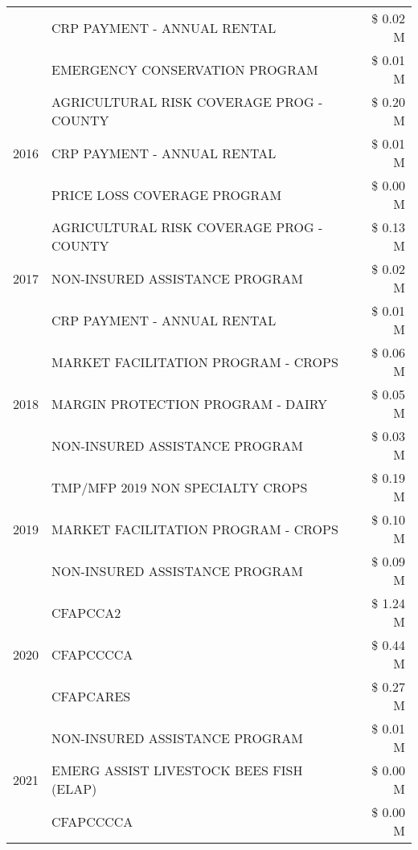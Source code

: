 \begin{tabular}{llr}
 & CRP PAYMENT - ANNUAL RENTAL & \$ 0.02 M \\
 & EMERGENCY CONSERVATION PROGRAM & \$ 0.01 M \\
\cline{1-3}
\multirow[t]{3}{*}{2016} & AGRICULTURAL RISK COVERAGE PROG - COUNTY & \$ 0.20 M \\
 & CRP PAYMENT - ANNUAL RENTAL & \$ 0.01 M \\
 & PRICE LOSS COVERAGE PROGRAM & \$ 0.00 M \\
\cline{1-3}
\multirow[t]{3}{*}{2017} & AGRICULTURAL RISK COVERAGE PROG - COUNTY & \$ 0.13 M \\
 & NON-INSURED ASSISTANCE PROGRAM & \$ 0.02 M \\
 & CRP PAYMENT - ANNUAL RENTAL & \$ 0.01 M \\
\cline{1-3}
\multirow[t]{3}{*}{2018} & MARKET FACILITATION PROGRAM - CROPS & \$ 0.06 M \\
 & MARGIN PROTECTION PROGRAM - DAIRY & \$ 0.05 M \\
 & NON-INSURED ASSISTANCE PROGRAM & \$ 0.03 M \\
\cline{1-3}
\multirow[t]{3}{*}{2019} & TMP/MFP 2019 NON SPECIALTY CROPS & \$ 0.19 M \\
 & MARKET FACILITATION PROGRAM - CROPS & \$ 0.10 M \\
 & NON-INSURED ASSISTANCE PROGRAM & \$ 0.09 M \\
\cline{1-3}
\multirow[t]{3}{*}{2020} & CFAPCCA2 & \$ 1.24 M \\
 & CFAPCCCCA & \$ 0.44 M \\
 & CFAPCARES & \$ 0.27 M \\
\cline{1-3}
\multirow[t]{3}{*}{2021} & NON-INSURED ASSISTANCE PROGRAM & \$ 0.01 M \\
 & EMERG ASSIST LIVESTOCK BEES FISH (ELAP) & \$ 0.00 M \\
 & CFAPCCCCA & \$ 0.00 M \\
\cline{1-3}
\bottomrule
\end{tabular}

